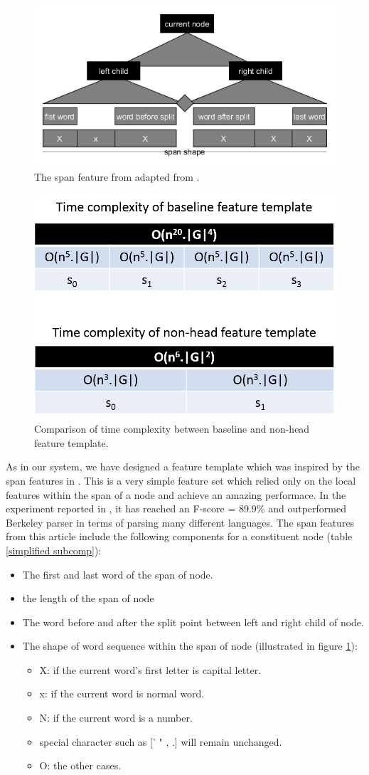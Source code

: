 \begin{figure}[t]
	\centering
	\includegraphics[width=0.7 \textwidth]{spanFeature.png}
	\caption{\label{spanFeature}The span feature from adapted from \cite{ref:2014David}.}
\end{figure}

\begin{figure}[h!]
	\centering
	\includegraphics[width=0.45 \textwidth]{FeatureTemplateTimeComplexity.png}
	\caption{\label{featComparison}Comparison of time complexity between baseline and non-head feature template.}
\end{figure}

As in our system, we have designed a feature template which was inspired by the span features in \cite{ref:2014David}. This is a very simple feature set which relied only on the local features within the span of a node and achieve an amazing performace. In the experiment reported in \cite{ref:2014David}, it  has reached an F-score = 89.9\% and outperformed Berkeley parser in terms of parsing many different languages. The span features from this article include the following components for a constituent node (table \ref{simplified subcomp}):
\begin{itemize}
	\item The first and last word of the span of node.
	\item the length of the span of node
	\item The word before and after the split point between left and right child of node.
	\item The shape of word sequence within the span of node (illustrated in figure \ref{spanFeature}):
	\begin{itemize}
		\item X: if the current word's first letter is capital letter.
		\item x: if the current word is normal word.
		\item N: if the current word is a number.
		\item special character such as [' " , .] will remain unchanged.
		\item O: the other cases.
	\end{itemize}
\end{itemize}

